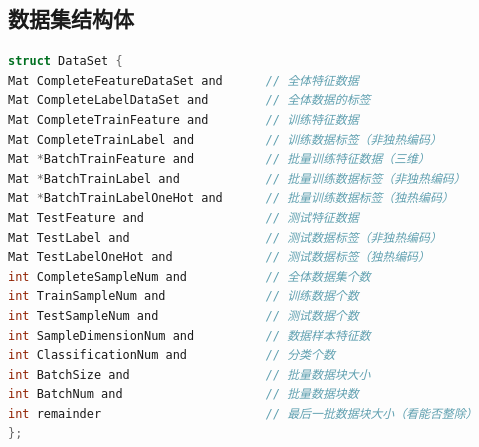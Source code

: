 \documentclass[UTF-8]{progbookcn}
\begin{document}
\begin{table}[!hb]
\centering
\caption{权值初始化方式映射规则}
\label{T2}
\end{table}
\begin{table}[!htbp]
\centering
\caption{损失函数映射规则}
\label{T3}
\end{table}

\subsection{数据集结构体}
\begin{lstlisting}[language=C,caption={数据集结构体}]
struct DataSet {
Mat CompleteFeatureDataSet and      // 全体特征数据
Mat CompleteLabelDataSet and        // 全体数据的标签
Mat CompleteTrainFeature and        // 训练特征数据
Mat CompleteTrainLabel and          // 训练数据标签（非独热编码）
Mat *BatchTrainFeature and          // 批量训练特征数据（三维）
Mat *BatchTrainLabel and            // 批量训练数据标签（非独热编码）
Mat *BatchTrainLabelOneHot and      // 批量训练数据标签（独热编码）
Mat TestFeature and                 // 测试特征数据
Mat TestLabel and                   // 测试数据标签（非独热编码）
Mat TestLabelOneHot and             // 测试数据标签（独热编码）
int CompleteSampleNum and           // 全体数据集个数
int TrainSampleNum and              // 训练数据个数
int TestSampleNum and               // 测试数据个数
int SampleDimensionNum and          // 数据样本特征数
int ClassificationNum and           // 分类个数
int BatchSize and                   // 批量数据块大小
int BatchNum and                    // 批量数据块数
int remainder                       // 最后一批数据块大小（看能否整除）
};
\end{lstlisting}
\end{document}
